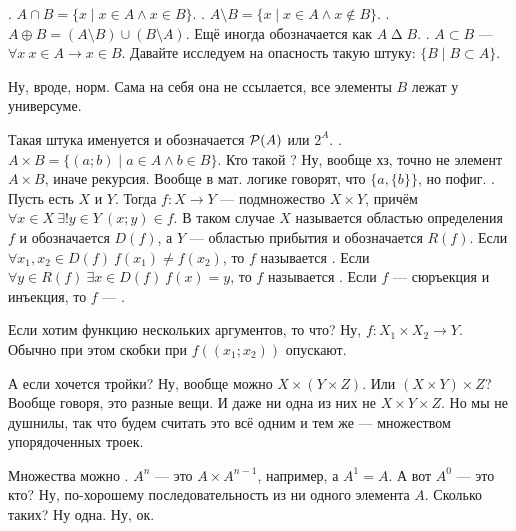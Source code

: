 \documentclass{article}
\begin{document}
\begin{itemize}
        \dfn {}. $A\cap B=\{x\mid x\in A\land x\in B\}$.
        \dfn {}. $A\setminus B=\{x\mid x\in A\land x\notin B\}$.
        \dfn {}. $A\oplus B=(A\setminus B)\cup(B\setminus A)$. Ещё иногда обозначается как $A\operatorname{\Delta}B$.
        \dfn {}. $A\subset B$ --- $\forall x~x\in A\rightarrow x\in B$.
        \thm Давайте исследуем на опасность такую штуку: $\{B\mid B\subset A\}$.
        \begin{Proof}
            Ну, вроде, норм. Сама на себя она не ссылается, все элементы $B$ лежат у универсуме.
        \end{Proof}
        \dfn Такая штука именуется  и обозначается ${\mathcal{P}}(A)$ или $2^A$.
        \dfn {}. $A\times B=\{(a;b)\mid a\in A\land b\in B\}$.
        \dfn Кто такой ? Ну, вообще хз, точно не элемент $A\times B$, иначе рекурсия. Вообще в мат. логике говорят, что $\{a,\{b\}\}$, но пофиг.
        \dfn {}. Пусть есть $X$ и $Y$. Тогда $f\colon X\to Y$ --- подмножество $X\times Y$, причём $\forall x\in X~\exists! y\in Y~(x;y)\in f$. В таком случае $X$ называется областью определения $f$ и обозначается $D(f)$, а $Y$ --- областью прибытия и обозначается $R(f)$.
        \dfn Если $\forall x_1,x_2\in D(f)~f(x_1)\neq f(x_2)$, то $f$ называется .
        \dfn Если $\forall y\in R(f)~\exists x\in D(f)~f(x)=y$, то $f$ называется .
        \dfn Если $f$ --- сюръекция и инъекция, то $f$ --- .
        \begin{Comment}
            Если хотим функцию нескольких аргументов, то что? Ну, $f\colon X_1\times X_2\to Y$. Обычно при этом скобки при $f((x_1;x_2))$ опускают.
        \end{Comment}
        \begin{Comment}
            А если хочется тройки? Ну, вообще можно $X\times(Y\times Z)$. Или $(X\times Y)\times Z$? Вообще говоря, это разные вещи. И даже ни одна из них не $X\times Y\times Z$. Но мы не душнилы, так что будем считать это всё одним и тем же --- множеством упорядоченных троек.
        \end{Comment}
        \dfn Множества можно . $A^n$ --- это $A\times A^{n-1}$, например, а $A^1=A$. А вот $A^0$ --- это кто? Ну, по-хорошему последовательность из ни одного элемента $A$. Сколько таких? Ну одна. Ну, ок.

\end{itemize}
\end{document}
